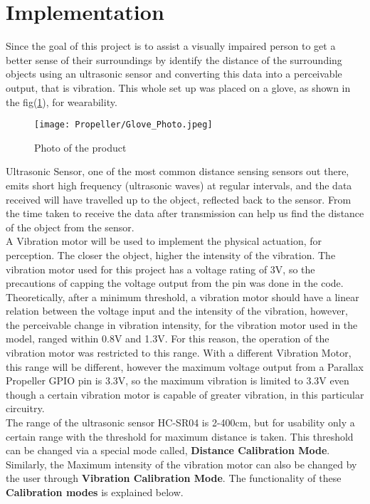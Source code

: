 \documentclass[twoside,11pt,letter]{article}
\begin{document}
\section{Implementation}
Since the goal of this project is to assist a visually impaired person to get a better sense of their surroundings by identify the distance of the surrounding objects using an ultrasonic sensor and converting this data into a perceivable output, that is vibration. This whole set up was placed on a glove, as shown in the fig(\ref{fig:glove}), for wearability.

\begin{figure}[h!]
        \centering
        \texttt{[image: Propeller/Glove\_Photo.jpeg]}
        \caption{Photo of the product}
        \label{fig:glove}
\end{figure}

Ultrasonic Sensor, one of the most common distance sensing sensors out there, emits short high frequency (ultrasonic waves) at regular intervals, and the data received will have travelled up to the object, reflected back to the sensor. From the time taken to receive the data after transmission can help us find the distance of the object from the sensor. \\
A Vibration motor will be used to implement the physical actuation, for perception. The closer the object, higher the intensity of the vibration. The vibration motor used for this project has a voltage rating of 3V, so the precautions of capping the voltage output from the pin was done in the code. Theoretically, after a minimum threshold, a vibration motor should have a linear relation between the voltage input and the intensity of the vibration, however, the perceivable change in vibration intensity, for the vibration motor used in the model, ranged within 0.8V and 1.3V. For this reason, the operation of the vibration motor was restricted to this range. With a different Vibration Motor, this range will be different, however the maximum voltage output from a Parallax Propeller GPIO pin is 3.3V, so the maximum vibration is limited to 3.3V even though a certain vibration motor is capable of greater vibration, in this particular circuitry. \\
The range of the ultrasonic sensor HC-SR04 is 2-400cm, but for usability only a certain range with the threshold for maximum distance is taken. This threshold can be changed via a special mode called, \textbf{Distance Calibration Mode}. Similarly, the Maximum intensity of the vibration motor can also be changed by the user through \textbf{Vibration Calibration Mode}. The functionality of these \textbf{Calibration modes} is explained below.
\end{document}
